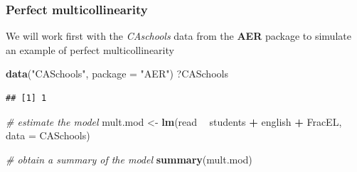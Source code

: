 \documentclass[]{book}
\newenvironment{Shaded}{\begin{snugshade}}{\end{snugshade}}
\newcommand{\CommentTok}[1]{\textcolor[rgb]{0.56,0.35,0.01}{\textit{#1}}}
\newcommand{\DataTypeTok}[1]{\textcolor[rgb]{0.13,0.29,0.53}{#1}}
\newcommand{\DecValTok}[1]{\textcolor[rgb]{0.00,0.00,0.81}{#1}}
\newcommand{\KeywordTok}[1]{\textcolor[rgb]{0.13,0.29,0.53}{\textbf{#1}}}
\newcommand{\NormalTok}[1]{#1}
\newcommand{\OperatorTok}[1]{\textcolor[rgb]{0.81,0.36,0.00}{\textbf{#1}}}
\newcommand{\StringTok}[1]{\textcolor[rgb]{0.31,0.60,0.02}{#1}}
\begin{document}
\hypertarget{perfect-multicollinearity}{%
\subsubsection{Perfect
multicollinearity}\label{perfect-multicollinearity}}

We will work first with the \emph{CAschools} data from the \textbf{AER}
package to simulate an example of perfect multicollinearity

\begin{Shaded}
\begin{Highlighting}[]
\KeywordTok{data}\NormalTok{(}\StringTok{"CASchools"}\NormalTok{, }\DataTypeTok{package =} \StringTok{"AER"}\NormalTok{)}
\NormalTok{?CASchools}
\end{Highlighting}
\end{Shaded}

\begin{Shaded}
\end{Shaded}

\begin{verbatim}
## [1] 1
\end{verbatim}

\begin{Shaded}
\begin{Highlighting}[]
\CommentTok{# estimate the model}
\NormalTok{mult.mod <-}\StringTok{ }\KeywordTok{lm}\NormalTok{(read }\OperatorTok{~}\StringTok{ }\NormalTok{students }\OperatorTok{+}\StringTok{ }\NormalTok{english }\OperatorTok{+}\StringTok{ }\NormalTok{FracEL, }\DataTypeTok{data =}\NormalTok{ CASchools) }

\CommentTok{# obtain a summary of the model}
\KeywordTok{summary}\NormalTok{(mult.mod)  }
\end{Highlighting}
\end{Shaded}
\end{document}

